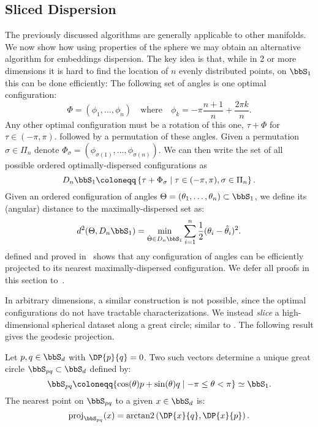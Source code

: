 \documentclass[10pt]{article} %
\begin{document}
\subsection{Sliced Dispersion}
The previously discussed algorithms are generally applicable to other manifolds.
We now show how using properties of the sphere we may obtain an alternative algorithm for embeddings dispersion. The key idea
is that, while in 2 or more dimensions it is hard to find the
location of \(n\) evenly distributed points, on \(\bbS_1\)
this can be done efficiently:
The following set of angles is one optimal configuration:
\[ \Phi=(\phi_1, \ldots, \phi_n) \quad\text{where}\quad \phi_k = -\pi\frac{n+1}{n} + \frac{2\pi
k}{n}. \]
Any other optimal configuration must be a rotation of this one, \ie \( \tau +
\Phi\) for \(\tau\in (-\pi, \pi)\).
followed by a permutation of these angles.
Given a permutation \(\sigma \in \Pi_n\) denote
\(\Phi_\sigma = (\phi_{\sigma(1)}, \ldots, \phi_{\sigma(n)}).\)
We can then write the set of all possible ordered
optimally-dispersed configurations as
\begin{equation}\label{eq:optimally-dispersed}
D_n \bbS_1 \coloneqq \left \{ \tau + \Phi_\sigma
 \mid
\tau \in (-\pi, \pi), \sigma \in \Pi_n \right \}.
\end{equation}
Given an ordered configuration of angles \(\Theta = (\theta_1, \ldots,
\theta_n) \subset \bbS_1\),
we define its (angular) distance to the maximally-dispersed set
as:
\begin{equation}\label{eq:distance_to_dispersed}
d^2(\Theta, D_n \bbS_1) =
\min_{\hat\Theta \in D_n \bbS_1} \sum_{i=1}^n
\frac{1}{2}(\theta_i-\hat{\theta}_i)^2.
\end{equation}
 defined and proved in~ shows that any configuration of angles can be efficiently
projected to its nearest maximally-dispersed configuration. We defer all proofs in this section to~.

In arbitrary dimensions, a similar construction is not possible, since the
optimal configurations do not have tractable characterizations. We instead 
\emph{slice} a high-dimensional spherical dataset along a great circle;
similar to \citet{bonet2023spherical}. The following result gives the geodesic projection.
\begin{lemma}
Let \(p, q \in \bbS_d\) with \(\DP{p}{q}=0\).
Two such vectors determine a unique great circle
\(\bbS_{pq} \subset \bbS_d\) defined by:
\[ \bbS_{pq} \coloneqq \{ \cos(\theta) p + \sin(\theta) q \mid -\pi \leq \theta < \pi \}
\simeq \bbS_1.\]
The nearest point on \(\bbS_{pq}\) to a given \(x \in \bbS_d\) is:
\begin{equation}
\operatorname{proj}_{{\bbS}_{pq}} (x)
=\operatorname{arctan2}\left(\DP{x}{q}, \DP{x}{p}\right).
\end{equation}
\end{lemma}
\end{document}
